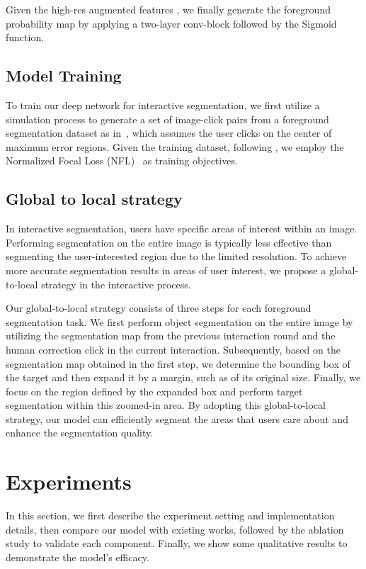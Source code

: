 \documentclass{bmvc2k}
\begin{document}
Given the high-res augmented features , we finally generate the foreground probability map by applying a two-layer conv-block followed by the Sigmoid function. 

\subsection{Model Training}\label{train}
To train our deep network for interactive segmentation, we first utilize a simulation process to generate a set of image-click pairs from a foreground segmentation dataset as in~\cite{sofiiuk2021reviving}, which assumes the user clicks on the center of maximum error regions. Given the training dataset, 
following \cite{sofiiuk2020f}, we employ the Normalized Focal Loss (NFL)~\cite{sofiiuk2019adaptis} as training objectives. 

\subsection{Global to local strategy}
In interactive segmentation, users have specific areas of interest within an image. Performing segmentation on the entire image is typically less effective than segmenting the user-interested region due to the limited resolution. To achieve more accurate segmentation results in areas of user interest, we propose a global-to-local strategy in the interactive process.

Our global-to-local strategy consists of three steps for each foreground segmentation task. We first perform object segmentation on the entire image by utilizing the segmentation map from the previous interaction round and the human correction click in the current interaction. Subsequently, based on the segmentation map obtained in the first
step, we determine the bounding box of the target and then expand it by a margin, such as  of its original size. Finally, we focus on the region defined by the expanded box and perform target segmentation within this zoomed-in area. By adopting this global-to-local strategy, our model can efficiently segment the areas that users care about and enhance the segmentation quality.



%
 \vspace{-3mm}
\section{Experiments}

In this section, we first describe the experiment setting and implementation details, 
then compare our model with existing works, followed by the ablation study to validate each component. 
Finally, we show some qualitative results to demonstrate the model's efficacy.
\end{document}

